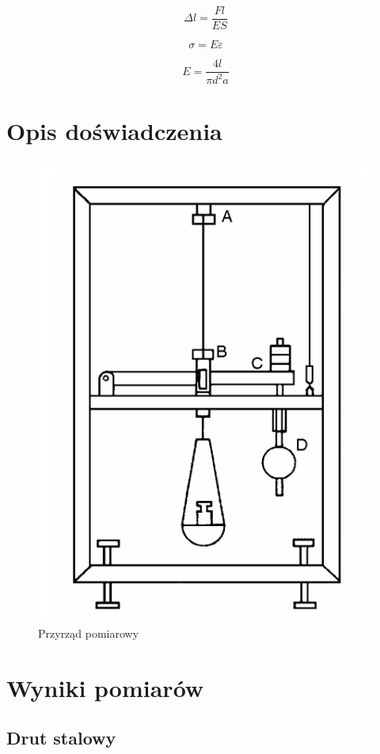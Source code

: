 \documentclass[a4paper,10pt,twoside]{article}
\begin{document}
$$ \Delta l = \frac{Fl}{ES} $$

$$ \sigma = E \varepsilon $$

$$ E = \frac{4l}{\pi d^2 a} $$

\section{Opis doświadczenia}

\begin{figure}[!htp]
\centerline{\includegraphics[scale=0.35]{przyrzad.png}}
\caption{Przyrząd pomiarowy}
\label{fig:tl}
\end{figure}

\section{Wyniki pomiarów}

\subsection{Drut stalowy}
\end{document}
